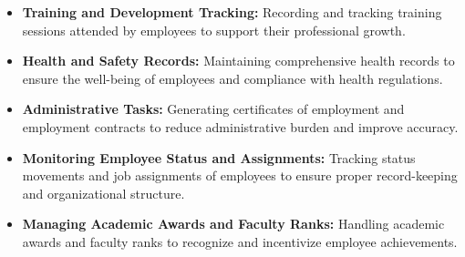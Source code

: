 \begin{itemize}
\begin{itemize}
            \item[] \textbf{Training and Development Tracking: } Recording and tracking training sessions attended by employees to support their professional growth.
            
            \item[] \textbf{Health and Safety Records: } Maintaining comprehensive health records to ensure the well-being of employees and compliance with health regulations.
            
            \item[] \textbf{Administrative Tasks: } Generating certificates of employment and employment contracts to reduce administrative burden and improve accuracy.
            
            \item[] \textbf{Monitoring Employee Status and Assignments:  } Tracking status movements and job assignments of employees to ensure proper record-keeping and organizational structure.
            
            \item[] \textbf{Managing Academic Awards and Faculty Ranks: } Handling academic awards and faculty ranks to recognize and incentivize employee achievements.
        \end{itemize}
       


\end{itemize}
